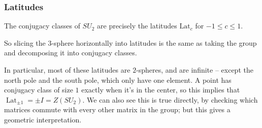 \subsubsection{Latitudes}

\begin{theorem}\label{conj latitudes}
    The conjugacy classes of $SU_2$ are precisely the latitudes $\text{Lat}_c$ for $-1 \leq c \leq 1$. 
\end{theorem}

So slicing the $3$-sphere horizontally into latitudes is the same as taking the group and decomposing it into conjugacy classes. 

In particular, most of these latitudes are $2$-spheres, and are infinite -- except the north pole and the south pole, which only have one element. A point has conjugacy class of size $1$ exactly when it's in the center, so this implies that $\operatorname{Lat}_{\pm 1} = \pm I = Z(SU_2)$. We can also see this is true directly, by checking which matrices commute with every other matrix in the group; but this gives a geometric interpretation. 


